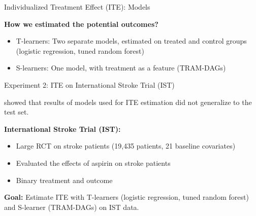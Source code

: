 \documentclass[onlytextwidth,english]{beamer}\usepackage[]{graphicx}\usepackage[]{xcolor}
\begin{document}
\begin{frame}{Individualized Treatment Effect (ITE): Models}


\textbf{How we estimated the potential outcomes?}

\begin{itemize}
    \item T-learners: Two separate models, estimated on treated and control groups (logistic regression, tuned random forest)
    \item S-learners: One model, with treatment as a feature (TRAM-DAGs)
\end{itemize}


\end{frame}






\begin{frame}{Experiment 2: ITE on International Stroke Trial (IST)}

\citet{chen2025} showed that results of models used for ITE estimation did not generalize to the test set.

\textbf{International Stroke Trial (IST):}

\begin{itemize}
    \item Large RCT on stroke patients (19,435 patients, 21 baseline covariates)
    \item Evaluated the effects of aspirin on stroke patients
    \item Binary treatment and outcome
\end{itemize}

\textbf{Goal:} Estimate ITE with T-learners (logistic regression, tuned random forest) and S-learner (TRAM-DAGs) on IST data.

\end{frame}



% 
% 
% 
% 
% 
\end{document}
